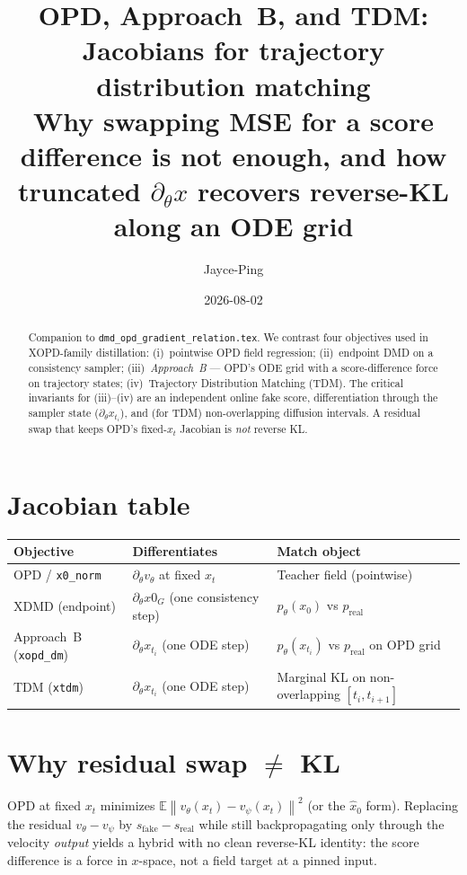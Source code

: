 \documentclass[11pt,a4paper]{article}
\title{\textbf{OPD, Approach~B, and TDM: Jacobians for trajectory distribution matching}\\[0.3em]
\large Why swapping MSE for a score difference is not enough, and how truncated
$\partial_\theta x$ recovers reverse-KL along an ODE grid}
\author{Jayce-Ping}
\date{2026-08-02}
\newcommand{\E}{\mathbb{E}}
\newcommand{\norm}[1]{\left\lVert #1 \right\rVert}
\newcommand{\xh}{\hat{x}_0}
\newcommand{\real}{\mathrm{real}}
\newcommand{\fake}{\mathrm{fake}}
\begin{document}
\maketitle

\begin{abstract}
Companion to \texttt{dmd\_opd\_gradient\_relation.tex}. We contrast four objectives used
in XOPD-family distillation: (i)~pointwise OPD field regression; (ii)~endpoint DMD on a
consistency sampler; (iii)~\emph{Approach~B} --- OPD's ODE grid with a score-difference
force on trajectory states; (iv)~Trajectory Distribution Matching (TDM). The critical
invariants for (iii)--(iv) are an independent online fake score, differentiation through
the sampler state ($\partial_\theta x_{t_i}$), and (for TDM) non-overlapping diffusion
intervals. A residual swap that keeps OPD's fixed-$x_t$ Jacobian is \emph{not} reverse KL.
\end{abstract}

\section{Jacobian table}

\begin{center}
\small
\begin{tabular}{@{}llp{5.2cm}@{}}
\toprule
Objective & Differentiates & Match object \\
\midrule
OPD / \texttt{x0\_norm} & $\partial_\theta v_\theta$ at fixed $x_t$ & Teacher field (pointwise) \\
XDMD (endpoint) & $\partial_\theta x0_G$ (one consistency step) & $p_\theta(x_0)$ vs $p_{\real}$ \\
Approach~B (\texttt{xopd\_dm}) & $\partial_\theta x_{t_i}$ (one ODE step) & $p_\theta(x_{t_i})$ vs $p_{\real}$ on OPD grid \\
TDM (\texttt{xtdm}) & $\partial_\theta x_{t_i}$ (one ODE step) & Marginal KL on non-overlapping $[t_i,t_{i+1}]$ \\
\bottomrule
\end{tabular}
\end{center}

\section[Why residual swap differs from KL]
{Why residual swap $\neq$ KL}

OPD at fixed $x_t$ minimizes $\E\norm{v_\theta(x_t)-v_\psi(x_t)}^2$ (or the $\xh$ form).
Replacing the residual $v_\theta-v_\psi$ by $s_{\fake}-s_{\real}$ while still backpropagating
only through the velocity \emph{output} yields a hybrid with no clean reverse-KL identity:
the score difference is a force in $x$-space, not a field target at a pinned input.
\end{document}
